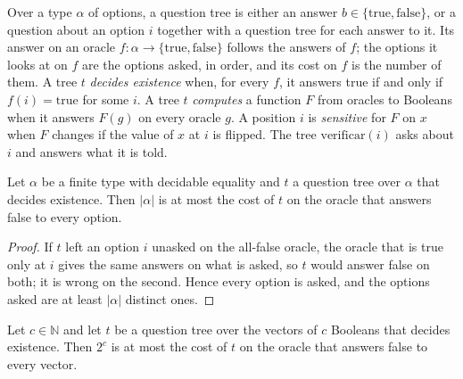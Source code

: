 \begin{definition}
  \label{def:search-pregunta}
  \leanok
  Over a type $\alpha$ of options, a question tree is either an answer $b \in \{\mathrm{true},
  \mathrm{false}\}$, or a question about an option $i$ together with a question tree for each
  answer to it. Its answer on an oracle $f : \alpha \to \{\mathrm{true}, \mathrm{false}\}$ follows
  the answers of $f$; the options it looks at on $f$ are the options asked, in order, and its cost
  on $f$ is the number of them. A tree $t$ \emph{decides existence} when, for every $f$, it answers
  true if and only if $f(i) = \mathrm{true}$ for some $i$. A tree $t$ \emph{computes} a function $F$
  from oracles to Booleans when it answers $F(g)$ on every oracle $g$. A position $i$ is
  \emph{sensitive} for $F$ on $x$ when $F$ changes if the value of $x$ at $i$ is flipped. The tree
  $\mathrm{verificar}(i)$ asks about $i$ and answers what it is told.
  \own{}
\end{definition}

\begin{theorem}
  \label{thm:search-costo-adversario}
  \leanok
  Let $\alpha$ be a finite type with decidable equality and $t$ a question tree over $\alpha$ that
  decides existence. Then $|\alpha|$ is at most the cost of $t$ on the oracle that answers false to
  every option.
  \own{}
\end{theorem}

\begin{proof}
  \leanok
  If $t$ left an option $i$ unasked on the all-false oracle, the oracle that is true only at $i$
  gives the same answers on what is asked, so $t$ would answer false on both; it is wrong on the
  second. Hence every option is asked, and the options asked are at least $|\alpha|$ distinct ones.
\end{proof}

\begin{theorem}
  \label{thm:search-decidir-ramas}
  \leanok
  Let $c \in \mathbb{N}$ and let $t$ be a question tree over the vectors of $c$ Booleans that
  decides existence. Then $2^c$ is at most the cost of $t$ on the oracle that answers false to every
  vector.
  \own{}
\end{theorem}

